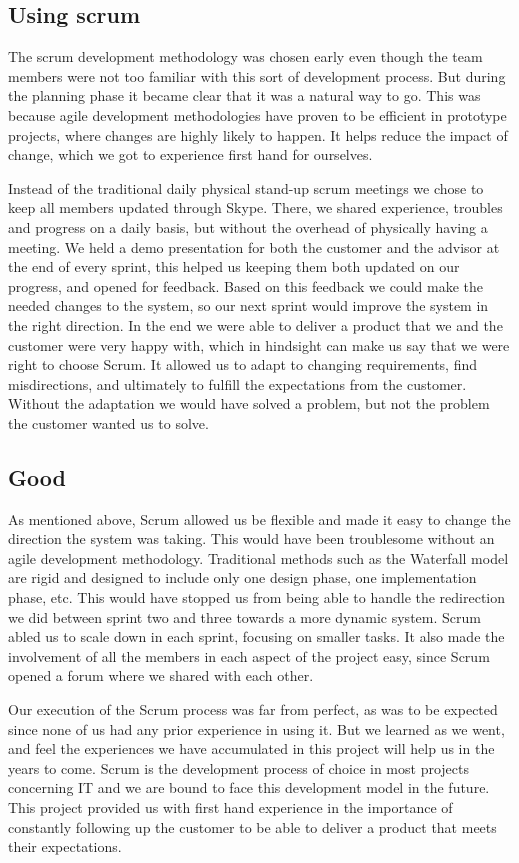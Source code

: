 \subsection*{Using scrum}
The scrum development methodology was chosen early even though the team members were not too familiar with this sort of development process. But during the planning phase it became clear that it was a natural way to go. This was because agile development methodologies have proven to be efficient in prototype projects, where changes are highly likely to happen. It helps reduce the impact of change, which we got to experience first hand for ourselves. 

Instead of the traditional daily physical stand-up scrum meetings we chose to keep all members updated through Skype. There, we shared experience, troubles and progress on a daily basis, but without the overhead of physically having a meeting. We held a demo presentation for both the customer and the advisor at the end of every sprint, this helped us keeping them both updated on our progress, and opened for feedback. Based on this feedback we could make the needed changes to the system, so our next sprint would improve the system in the right direction. In the end we were able to deliver a product that we and the customer were very happy with, which in hindsight can make us say that we were right to choose Scrum. It allowed us to adapt to changing requirements, find misdirections, and ultimately to fulfill the expectations from the customer. Without the adaptation we would have solved a problem, but not the problem the customer wanted us to solve.

\subsection*{Good}
As mentioned above, Scrum allowed us be flexible and made it easy to change the direction the system was taking. This would have been troublesome without an agile development methodology. Traditional methods such as the Waterfall model are rigid and designed to include only one design phase, one implementation phase, etc. This would have stopped us from being able to handle the redirection we did between sprint two and three towards a more dynamic system. Scrum abled us to scale down in each sprint, focusing on smaller tasks. It also made the involvement of all the members in each aspect of the project easy, since Scrum opened a forum where we shared with each other. 

Our execution of the Scrum process was far from perfect, as was to be expected since none of us had any prior experience in using it. But we learned as we went, and feel the experiences we have accumulated in this project will help us in the years to come. Scrum is the development process of choice in most projects concerning IT and we are bound to face this development model in the future. This project provided us with first hand experience in the importance of constantly following up the customer to be able to deliver a product that meets their expectations.

